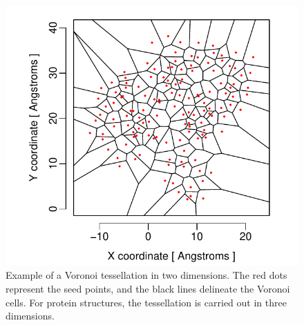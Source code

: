 \documentclass[12pt]{article}
\begin{document}
    \begin{figure}
        \begin{center}
        \includegraphics[width=6in]{voronoi_diagram.pdf}
        \end{center}
        \caption{Example of a Voronoi tessellation in two dimensions. The red dots represent the seed points, and the black lines delineate the Voronoi cells. For protein structures, the tessellation is carried out in three dimensions.}
        \label{fig:voronoi}
    \end{figure}
\end{document}
